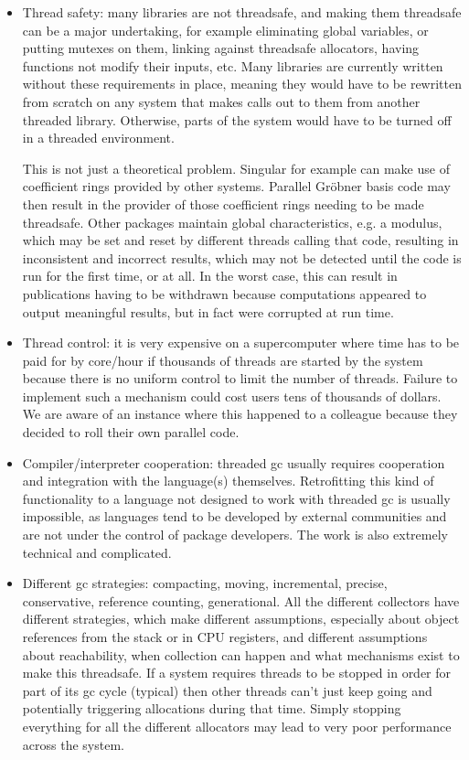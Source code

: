 \documentclass{deliverablereport}
\begin{document}
\begin{itemize}
\item Thread safety: many libraries are not threadsafe, and making them threadsafe can be a major
  undertaking, for example eliminating global variables, or putting mutexes on them, linking against
  threadsafe allocators, having functions not modify their inputs, etc. Many libraries are currently
  written without these requirements in place, meaning they would have to be rewritten from scratch
  on any system that makes calls out to them from another threaded library. Otherwise, parts of the
  system would have to be turned off in a threaded environment.

  This is not just a theoretical problem. Singular for example can make use of coefficient rings
  provided by other systems. Parallel Gr\"{o}bner basis code may then result in the provider of those
  coefficient rings needing to be made threadsafe. Other packages maintain global characteristics, e.g.
  a modulus, which may be set and reset by different threads calling that code, resulting in inconsistent
  and incorrect results, which may not be detected until the code is run for the first time, or at all.
  In the worst case, this can result in publications having to be withdrawn because computations appeared
  to output meaningful results, but in fact were corrupted at run time.

\item Thread control: it is very expensive on a supercomputer where time has to be paid for by core/hour if
  thousands of threads are started by the system because there is no uniform control to limit the number of
  threads. Failure to implement such a mechanism could cost users tens of thousands of dollars. We are aware
  of an instance where this happened to a colleague because they decided to roll their own parallel code.

\item Compiler/interpreter cooperation: threaded gc usually requires cooperation and integration with the
  language(s) themselves. Retrofitting this kind of functionality to a language not designed to work with
  threaded gc is usually impossible, as languages tend to be developed by external communities and are not
  under the control of package developers. The work is also extremely technical and complicated.

\item Different gc strategies: compacting, moving, incremental, precise, conservative, reference counting,
  generational. All the different collectors have different strategies, which make different assumptions,
  especially about object references from the stack or in CPU registers, and different assumptions about
  reachability, when collection can happen and what mechanisms exist to make this threadsafe. If a system
  requires threads to be stopped in order for part of its gc cycle (typical) then other threads can't just
  keep going and potentially triggering allocations during that time. Simply stopping everything for all
  the different allocators may lead to very poor performance across the system.


\end{itemize}
\end{document}
